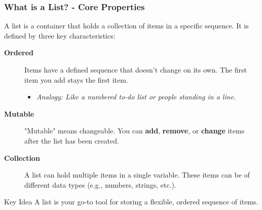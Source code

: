 \documentclass{beamer}
\begin{document}
\begin{frame}[fragile]
    \frametitle{What is a List? - Core Properties}
    
    A list is a container that holds a collection of items in a specific sequence. It is defined by three key characteristics:
    
    \vspace{1em}
    
    \begin{description}
        \item[\textbf{Ordered}] 
        Items have a defined sequence that doesn't change on its own. The first item you add stays the first item.
        \begin{itemize}
            \item \textit{Analogy: Like a numbered to-do list or people standing in a line.}
        \end{itemize}
        
        \item[\textbf{Mutable}] 
        "Mutable" means changeable. You can \textbf{add}, \textbf{remove}, or \textbf{change} items after the list has been created.
        
        \item[\textbf{Collection}] 
        A list can hold multiple items in a single variable. These items can be of different data types (e.g., numbers, strings, etc.).
    \end{description}
    
    \begin{alertblock}{Key Idea}
        A list is your go-to tool for storing a flexible, ordered sequence of items.
    \end{alertblock}
    
\end{frame}
\end{document}
